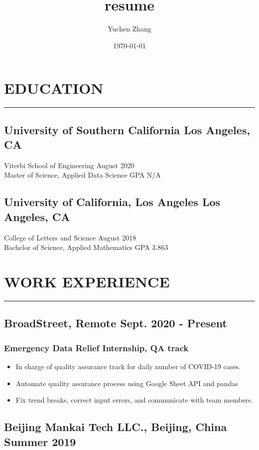 \documentclass{article}
\title{resume}
\author{Yuchen Zhang}
\date{\today}
\newcommand{\divider}{\vskip2pt\hrule\vskip2pt}
\begin{document}
	\section*{EDUCATION}
	\divider
		\subsection*{University of Southern California \hfill {\normalfont Los Angeles, CA}}
		\noindent
		Viterbi School of Engineering \hfill August 2020 \\
		Master of Science, Applied Data Science \hfill GPA N/A \\
		
		\subsection*{University of California, Los Angeles \hfill {\normalfont Los Angeles, CA}}
		\noindent
		College of Letters and Science \hfill August 2018 \\
		Bachelor of Science, Applied Mathematics \hfill GPA 3.863 \\
		
	\section*{WORK EXPERIENCE}
	\divider
		\subsection*{BroadStreet{\normalfont, Remote \hfill Sept. 2020 - Present}}
			\subsubsection*{Emergency Data Relief Internship, QA track}
			\begin{itemize}
				\setlength\itemsep{-1pt}
				\item In charge of quality assurance track for daily number of COVID-19 cases. 
				\item Automate quality assurance process using Google Sheet API and pandas
				\item Fix trend breaks, correct input errors, and communicate with team members.
			\end{itemize}
		
		
		\subsection*{Beijing Mankai Tech LLC.{\normalfont, Beijing, China \hfill Summer 2019}}
\end{document}
